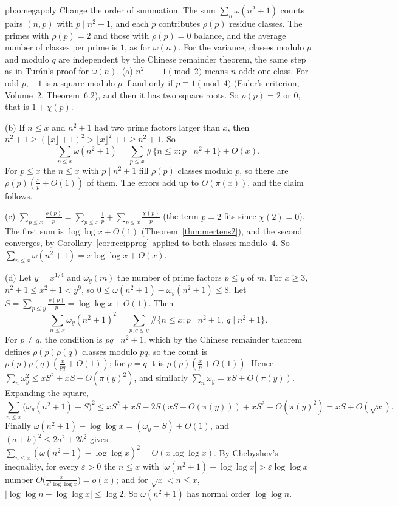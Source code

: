 \begin{solution}{pb:omegapoly}
\idea Change the order of summation. The sum $\sum_n\omega(n^2+1)$ counts pairs $(n,p)$ with $p\mid n^2+1$, and each $p$ contributes $\rho(p)$ residue classes. The primes with $\rho(p)=2$ and those with $\rho(p)=0$ balance, and the average number of classes per prime is $1$, as for $\omega(n)$. For the variance, classes modulo $p$ and modulo $q$ are independent by the Chinese remainder theorem, the same step as in Tur\'an's proof for $\omega(n)$.
\writeup (a) $n^2\equiv-1\pmod2$ means $n$ odd: one class. For odd $p$, $-1$ is a square modulo $p$ if and only if $p\equiv1\pmod4$ (Euler's criterion, Volume~2, Theorem~6.2), and then it has
two square roots. So $\rho(p)=2$ or $0$, that is $1+\chi(p)$.

(b) If $n\le x$ and $n^2+1$ had two prime factors larger than $x$, then $n^2+1\ge(\lfloor x\rfloor+1)^2>\lfloor x\rfloor^2+1\ge n^2+1$. So
\[
\sum_{n\le x}\omega(n^2+1)=\sum_{p\le x}\#\{n\le x:p\mid n^2+1\}+O(x).
\]
For $p\le x$ the $n\le x$ with $p\mid n^2+1$ fill $\rho(p)$ classes modulo $p$, so there are $\rho(p)(\frac xp+O(1))$ of them. The errors add up to $O(\pi(x))$, and the claim follows.

(c) $\sum_{p\le x}\frac{\rho(p)}p=\sum_{p\le x}\frac1p+\sum_{p\le x}\frac{\chi(p)}p$ (the term $p=2$ fits since $\chi(2)=0$). The first sum is $\log\log x+O(1)$ (Theorem~\ref{thm:mertens2}),
and the second converges, by Corollary~\ref{cor:recipprog} applied to both classes modulo~$4$. So $\sum_{n\le x}\omega(n^2+1)=x\log\log x+O(x)$.

(d) Let $y=x^{1/4}$ and $\omega_y(m)$ the number of prime factors $p\le y$ of $m$. For $x\ge3$, $n^2+1\le x^2+1<y^9$, so $0\le\omega(n^2+1)-\omega_y(n^2+1)\le8$. Let
$S=\sum_{p\le y}\frac{\rho(p)}p=\log\log x+O(1)$. Then
\[
\sum_{n\le x}\omega_y(n^2+1)^2=\sum_{p,q\le y}\#\{n\le x:p\mid n^2+1,\ q\mid n^2+1\}.
\]
For $p\ne q$, the condition is $pq\mid n^2+1$, which by the Chinese remainder theorem defines $\rho(p)\rho(q)$ classes modulo $pq$, so the count is $\rho(p)\rho(q)(\frac x{pq}+O(1))$;
for $p=q$ it is $\rho(p)(\frac xp+O(1))$. Hence $\sum_n\omega_y^2\le xS^2+xS+O(\pi(y)^2)$, and similarly $\sum_n\omega_y=xS+O(\pi(y))$. Expanding the square,
\[
\sum_{n\le x}\bigl(\omega_y(n^2+1)-S\bigr)^2\le xS^2+xS-2S(xS-O(\pi(y)))+xS^2+O(\pi(y)^2)=xS+O(\sqrt x).
\]
Finally $\omega(n^2+1)-\log\log x=(\omega_y-S)+O(1)$, and $(a+b)^2\le2a^2+2b^2$ gives $\sum_{n\le x}(\omega(n^2+1)-\log\log x)^2=O(x\log\log x)$. By Chebyshev's inequality, for every
$\varepsilon>0$ the $n\le x$ with $|\omega(n^2+1)-\log\log x|>\varepsilon\log\log x$ number $O\bigl(\frac x{\varepsilon^2\log\log x}\bigr)=o(x)$; and for $\sqrt x<n\le x$,
$|\log\log n-\log\log x|\le\log2$. So $\omega(n^2+1)$ has normal order $\log\log n$.


\end{solution}
